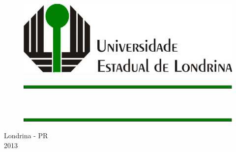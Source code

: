 
\thispagestyle{empty}
		\begin{figure}[htb]
					\centering \includegraphics[width=14cm]{1-capa/imagens/logo-uel.png}
		\end{figure}

		\begin{figure}[htb]
					\centering \includegraphics[scale=0.7]{1-capa/imagens/barra-capa.png}
		\end{figure}

		\begin{center}
            {\bf \large \nome }
    \end{center} 
				\begin{center}
                {\large \textbf {\titulotcc}} \\ \vspace{2ex}
				\end{center}


		\begin{figure}[htb]
				\centering \includegraphics[scale=0.7]{1-capa/imagens/barra-capa.png}
		\end{figure}

		\begin{center}
				{\tamanhonormal Londrina - PR \\ 2013}
		\end{center}
